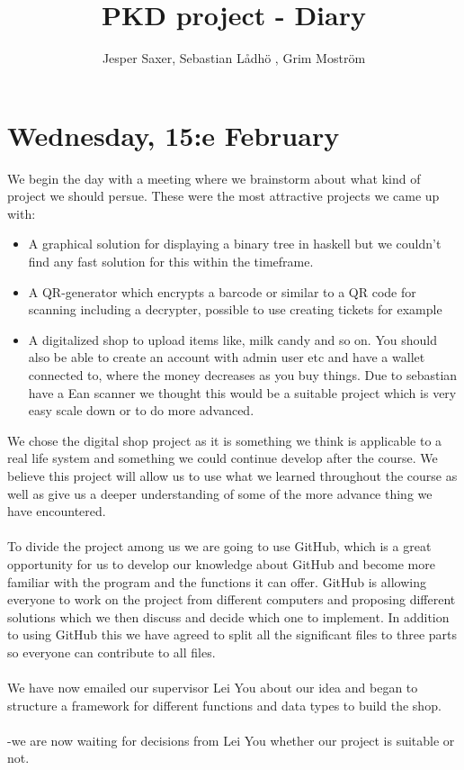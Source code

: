 \documentclass[11pt]{article}
\begin{document}
\title{PKD project - Diary}
\author{Jesper Saxer, Sebastian Lådhö , Grim Moström}
\date{}
\maketitle
\section*{Wednesday, 15:e February}
We begin the day with a meeting where we brainstorm about what kind of project we should persue. These were the most attractive projects we came up with:
\begin{itemize}
  \item A graphical solution for displaying a binary tree in haskell but we couldn't find any fast solution for this within the timeframe.
  \item A QR-generator which encrypts a barcode or similar to a QR code for scanning including a decrypter, possible to use creating tickets for example
  \item A digitalized shop to upload items like, milk candy and so on. You should also be able to create an account with admin user etc and have a wallet connected to, where the money decreases as you buy things. Due to sebastian have a Ean scanner we thought this would be a suitable project which is very easy scale down or to do more advanced.
\end{itemize}
We chose the digital shop project as it is something we think is applicable to a real life system and something we could continue develop after the course. We believe this project will allow us to use what we learned throughout the course as well as give us a deeper understanding of some of the more advance thing we have encountered.\\\\
To divide the project among us we are going to use GitHub, which is a great opportunity for us to develop our knowledge about GitHub and become more familiar with the program and the functions it can offer. GitHub is allowing everyone to work on the project from different computers and proposing different solutions which we then discuss and decide which one to implement. In addition to using GitHub this we have agreed to split all the significant files to three parts so everyone can contribute to all files.\\\\
We have now emailed our supervisor Lei You about our idea and began to structure a framework for different functions and data types to build the shop.\\\\
-we are now waiting for decisions from Lei You whether our project is suitable or not.\\
\end{document}
